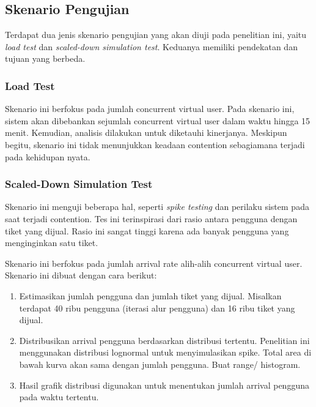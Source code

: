 \subsection{Skenario Pengujian}

Terdapat dua jenis skenario pengujian yang akan diuji pada penelitian ini, yaitu \textit{load test} dan \textit{scaled-down simulation test}. Keduanya memiliki pendekatan dan tujuan yang berbeda.

\subsubsection{Load Test}

Skenario ini berfokus pada jumlah concurrent virtual user. Pada skenario ini, sistem akan dibebankan sejumlah concurrent virtual user dalam waktu hingga 15 menit. Kemudian, analisis dilakukan untuk diketauhi kinerjanya. Meskipun begitu, skenario ini tidak menunjukkan keadaan contention sebagiamana terjadi pada kehidupan nyata.

\subsubsection{Scaled-Down Simulation Test}

Skenario ini menguji beberapa hal, seperti \textit{spike testing} dan perilaku sistem pada saat terjadi contention. Tes ini terinspirasi dari rasio antara pengguna dengan tiket yang dijual. Rasio ini sangat tinggi karena ada banyak pengguna yang menginginkan satu tiket.

Skenario ini berfokus pada jumlah arrival rate alih-alih concurrent virtual user. Skenario ini dibuat dengan cara berikut:

\begin{enumerate}
    \item Estimasikan jumlah pengguna dan jumlah tiket yang dijual. Misalkan terdapat 40 ribu pengguna (iterasi alur pengguna) dan 16 ribu tiket yang dijual.
    \item Distribusikan arrival pengguna berdasarkan distribusi tertentu. Penelitian ini menggunakan distribusi lognormal untuk menyimulasikan spike. Total area di bawah kurva akan sama dengan jumlah pengguna. Buat range/ histogram.
    \item Hasil grafik distribusi digunakan untuk menentukan jumlah arrival pengguna pada waktu tertentu.
\end{enumerate}
